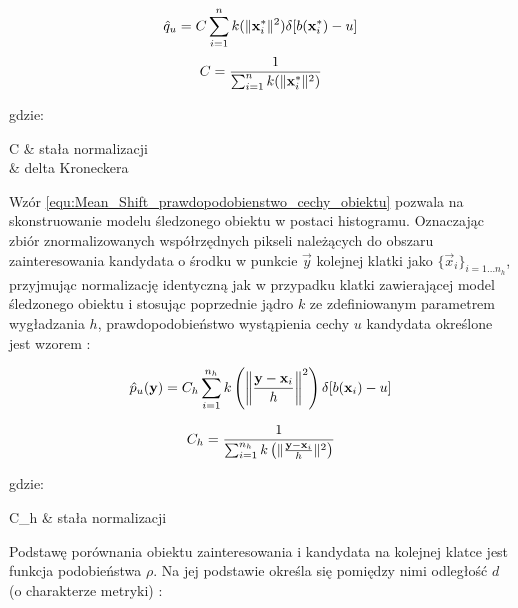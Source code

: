 \begin{equation}
\label{equ:Mean_Shift_prawdopodobienstwo_cechy_obiektu}
	\hat{q}_u = C \sum_{i=1}^n k (\norm{\vec{x}_i^*}^2) \delta [ b(\vec{x}_i^*) - u]
\end{equation}
\begin{equation}
\label{equ:Mean_Shift_prawdopodobienstwo_cechy_obiektu_stala_normalizacji}
	C = \frac{1}{\sum_{i=1}^n k (\norm{\vec{x}_i^*}^2) }
\end{equation}

\noindent
gdzie:

\begin{conditions}
	C & stała normalizacji \\
	\delta & delta Kroneckera \\
\end{conditions}

Wzór \ref{equ:Mean_Shift_prawdopodobienstwo_cechy_obiektu} pozwala na skonstruowanie modelu śledzonego obiektu w postaci histogramu. Oznaczając zbiór znormalizowanych współrzędnych pikseli należących do obszaru zainteresowania kandydata o środku w punkcie $\vec{y}$ kolejnej klatki jako $\{\vec{x}_i\}_{i=1 \dots n_h}$, przyjmując normalizację identyczną jak w przypadku klatki zawierającej model śledzonego obiektu i stosując poprzednie jądro $k$ ze zdefiniowanym parametrem wygładzania $h$, prawdopodobieństwo wystąpienia cechy $u$ kandydata określone jest wzorem \cite{Comaniciu2003}:

\begin{equation}
\label{equ:Mean_Shift_prawdopodobienstwo_cechy_kandydata}
	\hat{p}_u(\vec{y}) = C_h \sum_{i=1}^{n_h} k \left(\norm[\bigg]{\frac{\vec{y} - \vec{x}_i}{h}}^2\right) \delta [ b(\vec{x}_i) - u]
\end{equation}

\begin{equation}
\label{equ:Mean_Shift_prawdopodobienstwo_cechy_kandydata_stala_normalizacji}
	C_h = \frac{1}{\sum_{i=1}^{n_h} k \left(\norm{\frac{\vec{y} - \vec{x}_i}{h}}^2 \right) }
\end{equation}

\noindent
gdzie:

\begin{conditions}
	C_h & stała normalizacji \\
\end{conditions}

Podstawę porównania obiektu zainteresowania i kandydata na kolejnej klatce jest funkcja podobieństwa $\rho$. Na jej podstawie określa się pomiędzy nimi odległość $d$ (o charakterze metryki) \cite{Comaniciu2003}:


